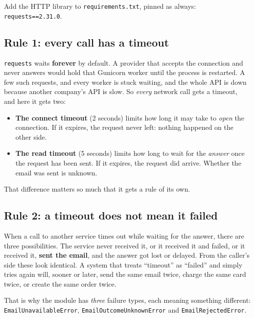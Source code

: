 Add the HTTP library to \texttt{requirements.txt}, pinned as always: \texttt{requests==2.31.0}.

\subsection*{Rule 1: every call has a timeout}\label{37-reliability:rule-1-every-call-has-a-timeout}

\texttt{requests} waits \textbf{forever} by default. A provider that accepts the connection and never answers would hold that Gunicorn worker until the process is restarted. A few such requests, and every worker is stuck waiting, and the whole API is down because another company's API is slow. So \emph{every} network call gets a timeout, and here it gets two:

\begin{itemize}
\tightlist
\item
  \textbf{The connect timeout} (2 seconds) limits how long it may take to \emph{open} the connection. If it expires, the request never left: nothing happened on the other side.
\item
  \textbf{The read timeout} (5 seconds) limits how long to wait for the \emph{answer} once the request has been sent. If it expires, the request did arrive. Whether the email was sent is unknown.
\end{itemize}

\noindent{}That difference matters so much that it gets a rule of its own.

\subsection*{Rule 2: a timeout does not mean it failed}\label{37-reliability:rule-2-a-timeout-does-not-mean-it-failed}

When a call to another service times out while waiting for the answer, there are three possibilities. The service never received it, or it received it and failed, or it received it, \textbf{sent the email}, and the answer got lost or delayed. From the caller's side these look identical. A system that treats ``timeout'' as ``failed'' and simply tries again will, sooner or later, send the same email twice, charge the same card twice, or create the same order twice.

That is why the module has \emph{three} failure types, each meaning something different: \texttt{EmailUnavailableError}, \texttt{EmailOutcomeUnknownError} and \texttt{EmailRejectedError}.

